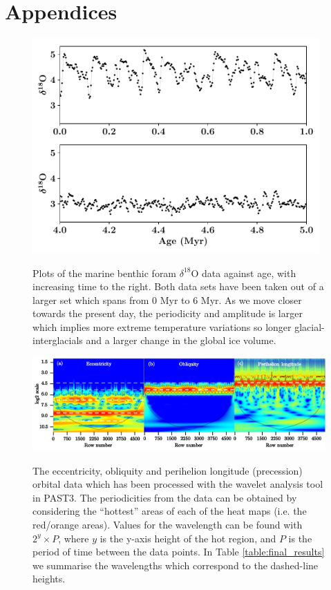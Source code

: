 \documentclass[12pt, onecolumn]{revtex4}    %
\begin{document}
\section*{Appendices}
\begin{figure}[!h]
\begin{center}
\includegraphics[width=11cm]{figures/foram_data}
\caption[]{Plots of the marine benthic foram $\delta^{18}$O data against age, with increasing time to the right. Both data sets have been taken out of a larger set which spans from 0 Myr to 6 Myr. As we move closer towards the present day, the periodicity and amplitude is larger which implies more extreme temperature variations so longer glacial-interglacials and a larger change in the global ice volume.}
\vspace{-3ex}
\label{fig:foram_data}
\end{center}
\end{figure}

\begin{figure}[!h]
\begin{center}
\includegraphics[width=16cm]{figures/wa_orbital_data}
\caption[]{The eccentricity, obliquity and perihelion longitude (precession) orbital data which has been processed with the wavelet analysis tool in PAST3. The periodicities from the data can be obtained by considering the ``hottest'' areas of each of the heat maps (i.e. the red/orange areas). Values for the wavelength can be found with $2^y \times P$, where $y$ is the y-axis height of the hot region, and $P$ is the period of time between the data points. In Table \ref{table:final_results} we summarise the wavelengths which correspond to the dashed-line heights.}
\vspace{-3ex}
\label{fig:wa_orbital_data}
\end{center}
\end{figure}
\end{document}
